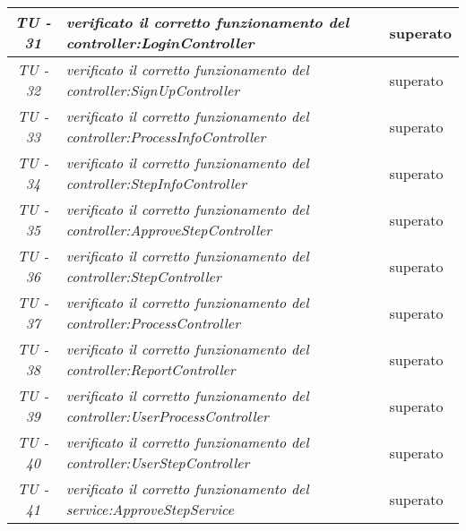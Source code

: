 \begin{small}\centering
\begin{tabular}{|c|p{8.0cm}|p{2.0cm}|}
\hline
\textit{TU - 31} &
\textit{verificato il corretto funzionamento del controller:LoginController} & superato \\
\hline

\textit{TU - 32} &
\textit{verificato il corretto funzionamento del controller:SignUpController} & superato \\
\hline

\textit{TU - 33} &
\textit{verificato il corretto funzionamento del controller:ProcessInfoController} & superato \\
\hline

\textit{TU - 34} &
\textit{verificato il corretto funzionamento del controller:StepInfoController} & superato \\
\hline

\textit{TU - 35} &
\textit{verificato il corretto funzionamento del controller:ApproveStepController} & superato \\
\hline

\textit{TU - 36} &
\textit{verificato il corretto funzionamento del controller:StepController} & superato \\
\hline

\textit{TU - 37} &
\textit{verificato il corretto funzionamento del controller:ProcessController} & superato \\
\hline

\textit{TU - 38} &
\textit{verificato il corretto funzionamento del controller:ReportController} & superato \\
\hline

\textit{TU - 39} &
\textit{verificato il corretto funzionamento del controller:UserProcessController} & superato \\
\hline

\textit{TU - 40} &
\textit{verificato il corretto funzionamento del controller:UserStepController} & superato \\
\hline

\textit{TU - 41} &
\textit{verificato il corretto funzionamento del service:ApproveStepService} & superato \\
\hline
\end{tabular}\\
\end{small}

